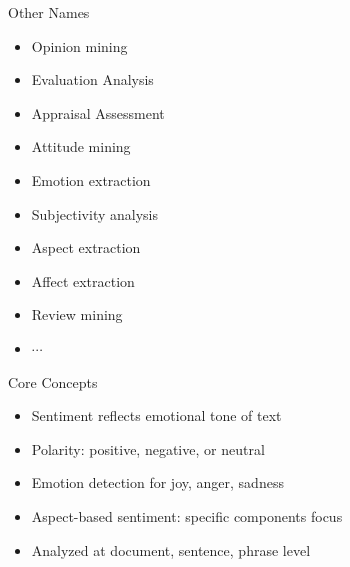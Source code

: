 \begin{frame}{Other Names}
\begin{itemize}
\item Opinion mining
\item Evaluation Analysis
\item Appraisal Assessment
\item Attitude mining
\item Emotion extraction
\item Subjectivity analysis
\item Aspect extraction
\item Affect extraction
\item Review mining
\item $\cdots$
\end{itemize}
\end{frame}
\begin{frame}{Core Concepts}
    \begin{itemize}
        \item Sentiment reflects emotional tone of text
        \item Polarity: positive, negative, or neutral
        \item Emotion detection for joy, anger, sadness
        \item Aspect-based sentiment: specific components focus
        \item Analyzed at document, sentence, phrase level
    \end{itemize}
\end{frame}

